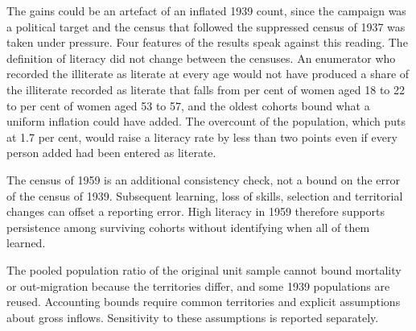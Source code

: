 The gains could be an artefact of an inflated 1939 count, since the campaign was a political target and the census that followed the suppressed census of 1937 was taken under pressure. Four features of the results speak against this reading. The definition of literacy did not change between the censuses. An enumerator who recorded the illiterate as literate at every age would not have produced a share of the illiterate recorded as literate that falls from  per cent of women aged 18 to 22 to  per cent of women aged 53 to 57, and the oldest cohorts bound what a uniform inflation could have added. The overcount of the population, which \citet{zhiromskaya2001} puts at 1.7 per cent, would raise a literacy rate by less than two points even if every person added had been entered as literate.

The census of 1959 is an additional consistency check, not a bound on the error of the census of 1939. Subsequent learning, loss of skills, selection and territorial changes can offset a reporting error. High literacy in 1959 therefore supports persistence among surviving cohorts without identifying when all of them learned.

The pooled population ratio of the original unit sample cannot bound mortality or out-migration because the territories differ, and some 1939 populations are reused. Accounting bounds require common territories and explicit assumptions about gross inflows. Sensitivity to these assumptions is reported separately.

\begin{table}[htbp]\centering
\caption{The cohorts of 1926 in the censuses of 1939 and 1959, RSFSR}\label{tab:c59}
\begingroup\small

\endgroup
\end{table}

\begin{table}[htbp]\centering
\caption{The five-year groups of 1926 in the census of 1939, RSFSR}\label{tab:c4}
\begingroup\small
\fitwidth{}
\endgroup
\end{table}

